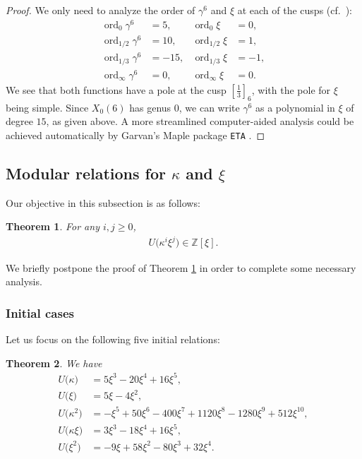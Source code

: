 \documentclass[12pt,reqno]{amsart}
\numberwithin{equation}{section}
\theoremstyle{theorem}
\newtheorem{theorem}{Theorem}
\theoremstyle{definition}
\newcommand{\ord}{\operatorname{ord}}
\begin{document}
\begin{proof}
	We only need to analyze the order of $\gamma^6$ and $\xi$ at each of the cusps (cf.~\cite[p.~18, Theorem 1.65]{Ono2004}):
	\begin{align*}
		\ord_0 \gamma^6 &= 5, & \ord_0 \xi &= 0,\\
		\ord_{1/2} \gamma^6 &= 10, & \ord_{1/2} \xi &= 1,\\
		\ord_{1/3} \gamma^6 &= -15, & \ord_{1/3} \xi &= -1,\\
		\ord_\infty \gamma^6 &= 0, & \ord_\infty \xi &= 0.
	\end{align*}
We see that both functions have a pole at the cusp $[\tfrac{1}{3}]_6$, with the pole for $\xi$ being simple. Since $X_0(6)$ has genus $0$, we can write $\gamma^6$ as a polynomial in $\xi$ of degree $15$, as given above. A more streamlined computer-aided analysis could be achieved automatically by Garvan's \textsf{Maple} package \texttt{ETA} \cite{Gar1999}.
\end{proof}


\subsection{Modular relations for $\kappa$ and $\xi$}\label{sec:zeta}

Our objective in this subsection is as follows:

\begin{theorem}\label{th:kx-xi-poly}
	For any $i,j\ge 0$,
	\begin{align}\label{eq:kx-xi-poly}
		U\big(\kappa^i\xi^j\big)\in \mathbb{Z}[\xi].
	\end{align}
\end{theorem}

We briefly postpone the proof of Theorem \ref{th:kx-xi-poly} in order to complete some necessary analysis.  

\subsubsection{Initial cases}

Let us focus on the following five initial relations:

\begin{theorem}\label{th:kx-xi-initial}
	We have
	\begin{align}
		U\big(\kappa\big) &= 5 \xi^3 - 20 \xi^4 + 16 \xi^5,\label{eq:k1x0}\\
		U\big(\xi\big) &= 5 \xi - 4 \xi^2,\label{eq:k0x1}\\
		U\big(\kappa^2\big) &= -\xi^5 + 50 \xi^6 - 400 \xi^7 + 1120 \xi^8 - 1280 \xi^9 + 512 \xi^{10},\label{eq:k2x0}\\
		U\big(\kappa\xi\big) &= 3 \xi^3 - 18 \xi^4 + 16 \xi^5,\label{eq:k1x1}\\
		U\big(\xi^2\big) &= -9 \xi + 58 \xi^2 - 80 \xi^3 + 32 \xi^4.\label{eq:k0x2}
	\end{align}
\end{theorem}
\end{document}
